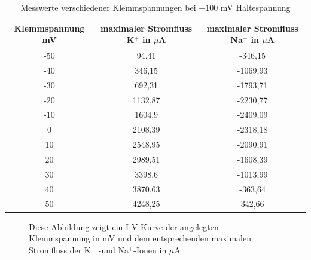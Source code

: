\documentclass[11pt]{article}
\begin{document}
\begin{table}[H]
\caption{Messwerte verschiedener Klemmspannungen bei $-100$ mV Haltespannung}
\centering
\begin{adjustbox}{width=1.3\textwidth, center=\textwidth}
\begin{tabular}{c|c|c}
Klemmspannung mV & maximaler Stromfluss K$^+$ in $\mu$A  & maximaler Stromfluss Na$^+$ in $\mu$A \\
\hline\hline
-50	&	94,41	&	-346,15	\\
-40	&	346,15	&	-1069,93	\\
-30	&	692,31	&	-1793,71	\\
-20	&	1132,87	&	-2230,77	\\
-10	&	1604,9	&	-2409,09	\\
0	&	2108,39	&	-2318,18	\\
10	&	2548,95	&	-2090,91	\\
20	&	2989,51	&	-1608,39	\\
30	&	3398,6	&	-1013,99	\\
40	&	3870,63	&	-363,64	\\
50	&	4248,25	&	342,66	
\end{tabular}
\end{adjustbox}
\label{werte32}
\end{table}
\begin{figure}[H]
\caption{Diese Abbildung zeigt ein I-V-Kurve der angelegten Klemmspannung in mV und dem entsprechenden maximalen Stromfluss der K$^+$ -und Na$^+$-Ionen in $\mu$A}
\label{iv-kurve}
\end{figure}
\end{document}
